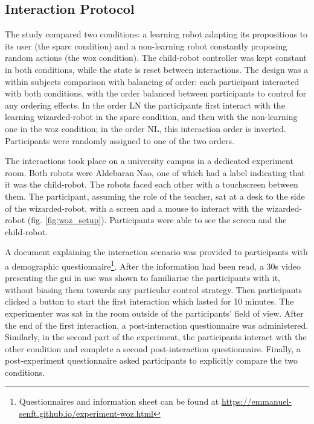 \subsection{Interaction Protocol}

The study compared two conditions: a learning robot adapting its propositions to its user (the \gls{sparc} condition) and a non-learning robot constantly proposing random actions (the \gls{woz} condition). The child-robot controller was kept constant in both conditions, while the state is reset between interactions. The design was a within subjects comparison with balancing of order: each participant interacted with both conditions, with the order balanced between participants to control for any ordering effects. In the order LN the participants first interact with the learning wizarded-robot in the \gls{sparc} condition, and then with the non-learning one in the \gls{woz} condition; in the order NL, this interaction order is inverted. Participants were randomly assigned to one of the two orders.

The interactions took place on a university campus in a dedicated experiment room. Both robots were Aldebaran Nao, one of which had a label indicating that it was the child-robot. The robots faced each other with a touchscreen between them. The participant, assuming the role of the teacher, sat at a desk to the side of the wizarded-robot, with a screen and a mouse to interact with the wizarded-robot (fig. \ref{fig:woz_setup}). Participants were able to see the screen and the child-robot.

A document explaining the interaction scenario was provided to participants with a demographic questionnaire\footnote{Questionnaires and information sheet can be found at \url{https://emmanuel-senft.github.io/experiment-woz.html}}. After the information had been read, a 30s video presenting the \gls{gui} in use was shown to familiarise the participants with it, without biasing them towards any particular control strategy. Then participants clicked a button to start the first interaction which lasted for 10 minutes. The experimenter was sat in the room outside of the participants' field of view. After the end of the first interaction, a post-interaction questionnaire was administered. Similarly, in the second part of the experiment, the participants interact with the other condition and complete a second post-interaction questionnaire. Finally, a post-experiment questionnaire asked participants to explicitly compare the two conditions.

